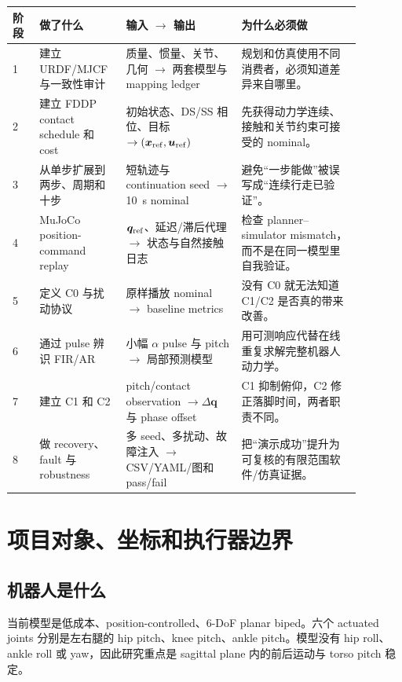 \documentclass[UTF8,11pt,a4paper]{ctexart}
\begin{document}
\begin{longtable}{@{}p{0.07\linewidth}p{0.20\linewidth}p{0.30\linewidth}p{0.31\linewidth}@{}}
\toprule
阶段 & 做了什么 & 输入 $\rightarrow$ 输出 & 为什么必须做 \\
\midrule
\endhead
1 & 建立 URDF/MJCF 与一致性审计 & 质量、惯量、关节、几何 $\rightarrow$ 两套模型与 mapping ledger & 规划和仿真使用不同消费者，必须知道差异来自哪里。\\
2 & 建立 FDDP contact schedule 和 cost & 初始状态、DS/SS 相位、目标 $\rightarrow (\bm x_{\rm ref},\bm u_{\rm ref})$ & 先获得动力学连续、接触和关节约束可接受的 nominal。\\
3 & 从单步扩展到两步、周期和十步 & 短轨迹与 continuation seed $\rightarrow$ \SI{10}{s} nominal & 避免“一步能做”被误写成“连续行走已验证”。\\
4 & MuJoCo position-command replay & $\bm q_{\rm ref}$、延迟/滞后代理 $\rightarrow$ 状态与自然接触日志 & 检查 planner--simulator mismatch，而不是在同一模型里自我验证。\\
5 & 定义 C0 与扰动协议 & 原样播放 nominal $\rightarrow$ baseline metrics & 没有 C0 就无法知道 C1/C2 是否真的带来改善。\\
6 & 通过 pulse 辨识 FIR/AR & 小幅 $\alpha$ pulse 与 pitch $\rightarrow$ 局部预测模型 & 用可测响应代替在线重复求解完整机器人动力学。\\
7 & 建立 C1 和 C2 & pitch/contact observation $\rightarrow\Delta\bm q$ 与 phase offset & C1 抑制俯仰，C2 修正落脚时间，两者职责不同。\\
8 & 做 recovery、fault 与 robustness & 多 seed、多扰动、故障注入 $\rightarrow$ CSV/YAML/图和 pass/fail & 把“演示成功”提升为可复核的有限范围软件/仿真证据。\\
\bottomrule
\end{longtable}

\section{项目对象、坐标和执行器边界}\label{sec:robot}

\subsection{机器人是什么}

当前模型是低成本、position-controlled、6-DoF planar biped。六个 actuated joints 分别是左右腿的 hip pitch、knee pitch、ankle pitch。模型没有 hip roll、ankle roll 或 yaw，因此研究重点是 sagittal plane 内的前后运动与 torso pitch 稳定。
\end{document}
